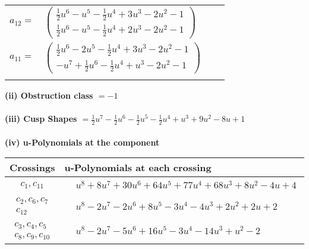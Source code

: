 \documentclass[1p]{elsarticle_modified}
\theoremstyle{definition}
\begin{document}
\begin{tabular}{m{7pt} m{180pt} m{7pt} m{180pt} }
\flushright $a_{12}=$&$\begin{pmatrix}\frac{1}{2} u^6- u^5-\frac{1}{2} u^4+3 u^3-2 u^2-1\\\frac{1}{2} u^6- u^5-\frac{1}{2} u^4+2 u^3-2 u^2-1\end{pmatrix}$ \\
\flushright $a_{11}=$&$\begin{pmatrix}\frac{1}{2} u^6-2 u^5-\frac{1}{2} u^4+3 u^3-2 u^2-1\\- u^7+\frac{1}{2} u^6-\frac{1}{2} u^4+u^3-2 u^2-1\end{pmatrix}$\\&\end{tabular}
\flushleft \textbf{(ii) Obstruction class $= -1$}\\~\\
\flushleft \textbf{(iii) Cusp Shapes $= \frac{1}{2} u^7-\frac{1}{2} u^6-\frac{1}{2} u^5-\frac{1}{2} u^4+u^3+9 u^2-8 u+1$}\\~\\
\newpage\renewcommand{\arraystretch}{1}
\flushleft \textbf{(iv) u-Polynomials at the component}\newline \\
\begin{tabular}{m{50pt}|m{274pt}}
Crossings & \hspace{64pt}u-Polynomials at each crossing \\
\hline $$\begin{aligned}c_{1},c_{11}\end{aligned}$$&$\begin{aligned}
&u^8+8 u^7+30 u^6+64 u^5+77 u^4+68 u^3+8 u^2-4 u+4
\end{aligned}$\\
\hline $$\begin{aligned}c_{2},c_{6},c_{7}\\c_{12}\end{aligned}$$&$\begin{aligned}
&u^8-2 u^7-2 u^6+8 u^5-3 u^4-4 u^3+2 u^2+2 u+2
\end{aligned}$\\
\hline $$\begin{aligned}c_{3},c_{4},c_{5}\\c_{8},c_{9},c_{10}\end{aligned}$$&$\begin{aligned}
&u^8-2 u^7-5 u^6+16 u^5-3 u^4-14 u^3+u^2-2
\end{aligned}$\\
\hline
\end{tabular}\\~\\
\end{document}
